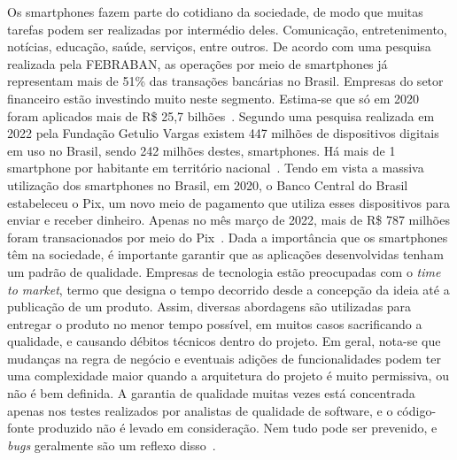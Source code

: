 Os smartphones fazem parte do cotidiano da sociedade, de modo que muitas tarefas podem ser realizadas por intermédio deles.
Comunicação, entretenimento, notícias, educação, saúde, serviços, entre outros.
De acordo com uma pesquisa realizada pela FEBRABAN, as operações por meio de smartphones já representam mais de 51\% das transações bancárias no Brasil.
Empresas do setor financeiro estão investindo muito neste segmento.
Estima-se que só em 2020 foram aplicados mais de R\$ 25,7 bilhões~\cite{febraban-data}.
Segundo uma pesquisa realizada em 2022 pela Fundação Getulio Vargas existem 447 milhões de dispositivos digitais em uso no Brasil, sendo 242 milhões destes, smartphones.
Há mais de 1 smartphone por habitante em território nacional~\cite{it-usage-data}.
Tendo em vista a massiva utilização dos smartphones no Brasil, em 2020, o Banco Central do Brasil estabeleceu o Pix, um novo meio de pagamento que utiliza esses dispositivos para enviar e receber dinheiro.
Apenas no mês março de 2022, mais de R\$ 787 milhões foram transacionados por meio do Pix~\cite{pix-statistics}.
Dada a importância que os smartphones têm na sociedade, é importante garantir que as aplicações desenvolvidas tenham um padrão de qualidade.
Empresas de tecnologia estão preocupadas com o \emph{time to market}, termo que designa o tempo decorrido desde a concepção da ideia até a publicação de um produto.
Assim, diversas abordagens são utilizadas para entregar o produto no menor tempo possível, em muitos casos sacrificando a qualidade, e causando débitos técnicos dentro do projeto.
Em geral, nota-se que mudanças na regra de negócio e eventuais adições de funcionalidades podem ter uma complexidade maior quando a arquitetura do projeto é muito permissiva, ou não é bem definida.
A garantia de qualidade muitas vezes está concentrada apenas nos testes realizados por analistas de qualidade de software, e o código-fonte produzido não é levado em consideração.
Nem tudo pode ser prevenido, e \emph{bugs} geralmente são um reflexo disso~\cite{quality-standards-paper}.